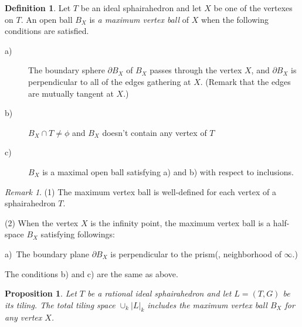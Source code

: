 \documentclass[suppldata, dvipdfmx]{interact}
\theoremstyle{plain}%
\newtheorem{proposition}[theorem]{Proposition}
\theoremstyle{definition}
\newtheorem{definition}[theorem]{Definition}
\theoremstyle{remark}
\newtheorem{remark}{Remark}
\theoremstyle{problemstyle}
\begin{document}
\begin{definition}
 Let $T$ be an ideal sphairahedron and let $X$ be one of the vertexes on $T$.
 An open ball $B_X$ is \textit{a maximum vertex ball} of $X$ when the following conditions are satisfied.
 \begin{description}
  \item[a)] The boundary sphere $\partial B_X$ of $B_X$ passes through
             the vertex $X$, and $\partial B_X$ is perpendicular to all of the
             edges gathering at $X$. (Remark that the edges are mutually tangent at $X$.)
  \item[b)] $B_X \cap T \neq \phi$ and $B_X$ doesn't contain any vertex of
             $T$
  \item[c)] $B_X$ is a maximal open ball satisfying a) and b) with respect to inclusions.
 \end{description}
\end{definition}

\begin{remark}
(1) The maximum vertex ball is well-defined for each vertex of a sphairahedron $T$.\par
(2) When the vertex $X$ is the infinity point,
the maximum vertex ball is a half-space $B_X$ satisfying followings:\par
a)\ The boundary plane $\partial B_X$ is perpendicular to the prism(, neighborhood of $\infty$.)\par
The conditions b) and c) are the same as above.\par
\end{remark}

\begin{proposition}\label{prop:limitBall}
Let $T$ be a rational ideal sphairahedron and let $L=(T,G)$ be its tiling.  
The total tiling space $\cup_k |L|_k$ includes the maximum vertex ball $B_X$ for any vertex $X$.
\end{proposition}
\end{document}
